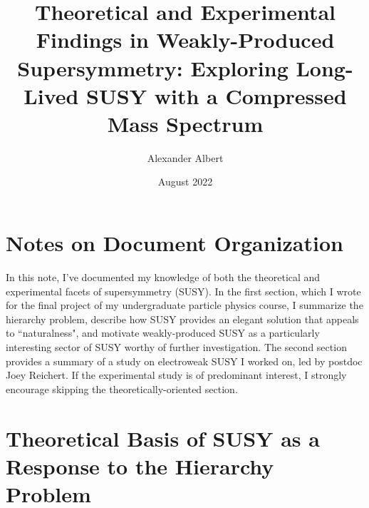 \documentclass{article}
\title{Theoretical and Experimental Findings in Weakly-Produced Supersymmetry: Exploring Long-Lived SUSY with a Compressed Mass Spectrum}
\author{Alexander Albert}
\date{August 2022}
\begin{document}
\maketitle
\newpage
\tableofcontents
\newpage
\section{Notes on Document Organization}
In this note, I've documented my knowledge of both the theoretical and experimental facets of supersymmetry (SUSY). In the first section, which I wrote for the final project of my undergraduate particle physics course, I summarize the hierarchy problem, describe how SUSY provides an elegant solution that appeals to ``naturalness", and motivate weakly-produced SUSY as a particularly interesting sector of SUSY worthy of further investigation. The second section provides a summary of a study on electroweak SUSY I worked on, led by postdoc Joey Reichert. If the experimental study is of predominant interest, I strongly encourage skipping the theoretically-oriented section.
\section{Theoretical Basis of SUSY as a Response to the Hierarchy Problem}
\end{document}
